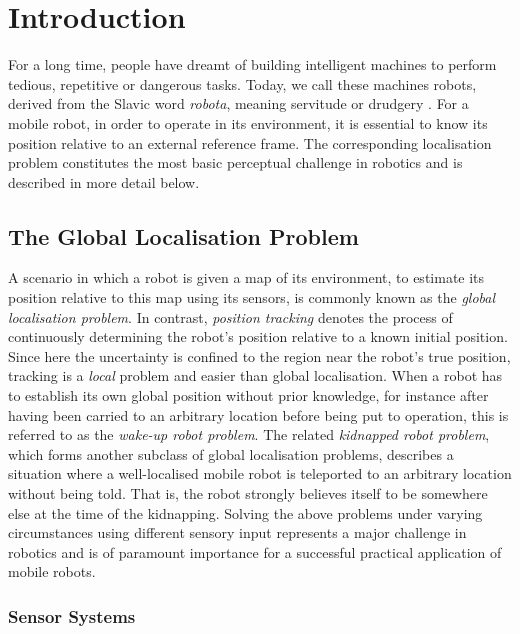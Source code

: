 \chapter{Introduction}\label{ch:introduction}

For a long time, people have dreamt of building intelligent machines to perform tedious, repetitive or dangerous tasks. Today, we call these machines robots, derived from the Slavic word \emph{robota},  meaning servitude or drudgery \cite{choset2005principles}. For a mobile robot, in order to operate in its environment, it is essential to know its position relative to an external reference frame. The corresponding localisation problem constitutes the most basic perceptual challenge in robotics and is described in more detail below.

\section{The Global Localisation Problem}

 A scenario in which a robot is given a map of its environment, to estimate its position relative to this map using its sensors, is commonly known as the \emph{global localisation problem}. In contrast, \emph{position tracking} denotes the process of continuously determining the robot's position relative to a known initial position. Since here the uncertainty is confined to the region near the robot's true position, tracking is a \emph{local} problem and easier than global localisation. When a robot has to establish its own global position without prior knowledge, for instance after having been carried to an arbitrary location before being put to operation, this is referred to as the \emph{wake-up robot problem}. The related \emph{kidnapped robot problem}, which forms another subclass of global localisation problems, describes a situation where a well-localised mobile robot is teleported to an arbitrary location without being told. That is, the robot strongly believes itself to be somewhere else at the time of the kidnapping. Solving the above problems under varying circumstances using different sensory input represents a major challenge in robotics and is of paramount importance for a successful practical application of mobile robots.
 
 \subsection{Sensor Systems}
 
